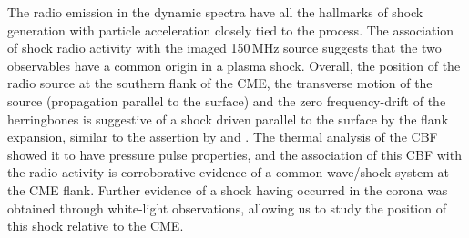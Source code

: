 The radio emission in the dynamic spectra have all the hallmarks of shock generation with particle acceleration closely tied to the process. The association of shock radio activity with the imaged 150\,MHz source suggests that the two observables have a common origin in a plasma shock. Overall, the position of the radio source at the southern flank of the CME, the transverse motion of the source (propagation parallel to the surface) and the zero frequency-drift of the herringbones is suggestive of a shock driven parallel to the surface by the flank expansion, similar to the assertion by \cite{stewart1980} and \cite{schmidt2012}. The thermal analysis of the CBF showed it to have pressure pulse properties, and the association of this CBF with the radio activity is corroborative evidence of a common wave/shock system at the CME flank. Further evidence of a shock having occurred in the corona was obtained through white-light observations, allowing us to study the position of this shock relative to the CME.

